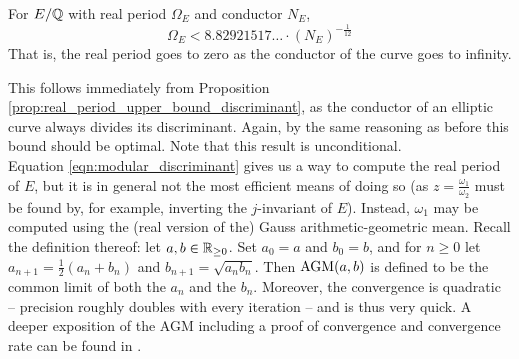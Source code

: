\begin{corollary}\label{cor:real_period_upper_bound}
For $E/\mathbb{Q}$ with real period $\Omega_E$ and conductor $N_E$,
\begin{equation}
\Omega_E < 8.82921517\ldots \cdot (N_E)^{-\frac{1}{12}}
\end{equation}
That is, the real period goes to zero as the conductor of the curve goes to infinity.
\end{corollary}
This follows immediately from Proposition \ref{prop:real_period_upper_bound_discriminant}, as the conductor of an elliptic curve always divides its discriminant. Again, by the same reasoning as before this bound should be optimal. Note that this result is unconditional. \\

Equation \ref{eqn:modular_discriminant} gives us a way to compute the real period of $E$, but it is in general not the most efficient means of doing so (as $z = \frac{\omega_1}{\omega_2}$ must be found by, for example, inverting the $j$-invariant of $E$). Instead, $\omega_1$ may be computed using the (real version of the) Gauss arithmetic-geometric mean. Recall the definition thereof: let $a,b \in \mathbb{R}_{\ge0}$. Set $a_0 = a$ and $b_0 = b$, and for $n\ge 0$ let $a_{n+1} = \frac{1}{2}(a_{n}+b_{n})$ and $b_{n+1} = \sqrt{a_{n}b_{n}}$. Then $\text{AGM}(a,b)$ is defined to be the common limit of both the $a_n$ and the $b_n$. Moreover, the convergence is quadratic -- precision roughly doubles with every iteration -- and is thus very quick. A deeper exposition of the AGM including a proof of convergence and convergence rate can be found in \cite{Cox-2000}.

